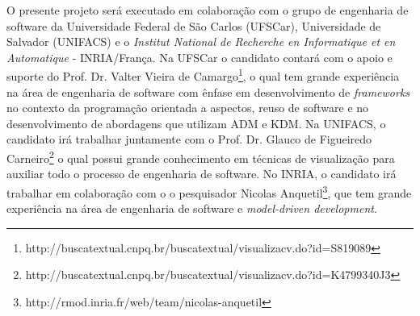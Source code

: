 \documentclass[12pt]{article}
\begin{document}
O presente projeto será executado em colaboração com o grupo de engenharia de software da Universidade Federal de São Carlos (UFSCar), Universidade de Salvador (UNIFACS) e o \textit{Institut National de Recherche en Informatique et en Automatique} - INRIA/França. Na UFSCar o candidato contará com o apoio e suporte do Prof. Dr. Valter Vieira de Camargo\footnote{http://buscatextual.cnpq.br/buscatextual/visualizacv.do?id=S819089}, o qual tem grande experiência na área de engenharia de software com ênfase em desenvolvimento de \textit{frameworks} no contexto da programação orientada a aspectos, reuso de software e no desenvolvimento de abordagens que utilizam ADM e KDM. Na UNIFACS, o candidato irá trabalhar juntamente com o Prof. Dr. Glauco de Figueiredo Carneiro\footnote{http://buscatextual.cnpq.br/buscatextual/visualizacv.do?id=K4799340J3} o qual possui grande conhecimento em técnicas de visualização para auxiliar todo o processo de engenharia de software. No INRIA, o candidato irá trabalhar em colaboração com o o pesquisador Nicolas Anquetil\footnote{http://rmod.inria.fr/web/team/nicolas-anquetil}, que tem grande experiência na área de engenharia de software e \textit{model-driven development}.

\small


\end{document}
